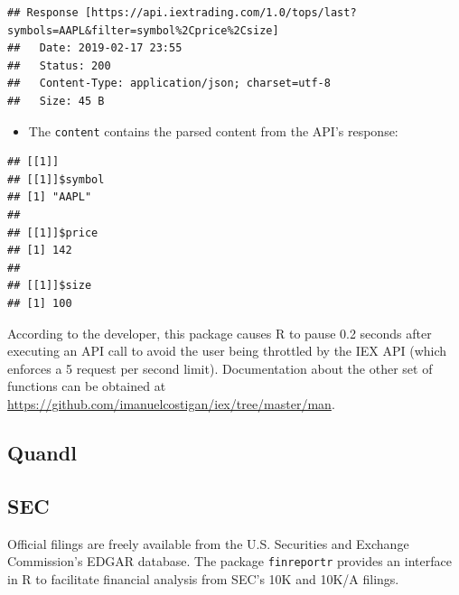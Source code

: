 \documentclass[]{book}
\newenvironment{Shaded}{\begin{snugshade}}{\end{snugshade}}
\newcommand{\OperatorTok}[1]{\textcolor[rgb]{0.81,0.36,0.00}{\textbf{#1}}}
\newcommand{\NormalTok}[1]{#1}
\providecommand{\tightlist}{%
  \setlength{\itemsep}{0pt}\setlength{\parskip}{0pt}}
\theoremstyle{definition}
\theoremstyle{definition}
\theoremstyle{definition}
\theoremstyle{remark}
\begin{document}
\begin{Shaded}
\end{Shaded}

\begin{verbatim}
## Response [https://api.iextrading.com/1.0/tops/last?symbols=AAPL&filter=symbol%2Cprice%2Csize]
##   Date: 2019-02-17 23:55
##   Status: 200
##   Content-Type: application/json; charset=utf-8
##   Size: 45 B
\end{verbatim}

\begin{itemize}
\tightlist
\item
  The \texttt{content} contains the parsed content from the API's
  response:
\end{itemize}

\begin{Shaded}
\end{Shaded}

\begin{verbatim}
## [[1]]
## [[1]]$symbol
## [1] "AAPL"
## 
## [[1]]$price
## [1] 142
## 
## [[1]]$size
## [1] 100
\end{verbatim}

According to the developer, this package causes R to pause 0.2 seconds
after executing an API call to avoid the user being throttled by the IEX
API (which enforces a 5 request per second limit). Documentation about
the other set of functions can be obtained at
\url{https://github.com/imanuelcostigan/iex/tree/master/man}.

\subsection{Quandl}\label{quandl}

\subsection{SEC}\label{sec}

Official filings are freely available from the U.S. Securities and
Exchange Commission's EDGAR database. The package \texttt{finreportr}
provides an interface in R to facilitate financial analysis from SEC's
10K and 10K/A filings.
\end{document}

